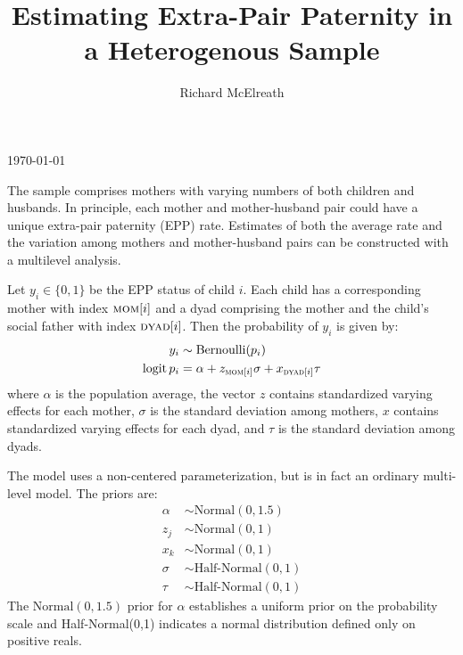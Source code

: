 \documentclass[reqno ,12pt]{amsart}
\DeclareMathOperator{\logit}{logit}
\newcommand{\mr}{\mathrm}
\begin{document}
\title{Estimating Extra-Pair Paternity in a Heterogenous Sample}
\author{Richard McElreath}
\address{Department of Human Behavior, Ecology and Culture, Max Planck Institute for Evolutionary Anthropology, Leipzig, Germany}


\maketitle

{\vspace{-6pt}\footnotesize\begin{center}\today\end{center}\vspace{12pt}}

\linenumbers
\modulolinenumbers[3]




The sample comprises mothers with varying numbers of both children and husbands. In principle, each mother and mother-husband pair could have a unique extra-pair paternity (EPP) rate. Estimates of both the average rate and the variation among mothers and mother-husband pairs can be constructed with a multilevel analysis.

Let $y_i \in \{0,1\}$ be the EPP status of child $i$. Each child has a corresponding mother with index $\textsc{mom}[i]$ and a dyad comprising the mother and the child's social father with index $\textsc{dyad}[i]$. Then the probability of $y_i$ is given by:
\begin{align*}
	y_i &\sim \mathrm{Bernoulli}(p_i)\\
	\logit p_i &= \alpha + z_{\textsc{mom}[i]} \sigma + x_{\textsc{dyad}[i]} \tau
\end{align*}
where $\alpha$ is the population average, the vector $z$ contains standardized varying effects for each mother, $\sigma$ is the standard deviation among mothers, $x$ contains standardized varying effects for each dyad, and $\tau$ is the standard deviation among dyads.

The model uses a non-centered parameterization, but is in fact an ordinary multi-level model. The priors are:
\begin{align*}
	\alpha &\sim \mr{Normal}(0,1.5)\\
	z_j &\sim \mr{Normal}(0,1)\\
	x_k &\sim \mr{Normal}(0,1)\\
	\sigma &\sim \text{Half-Normal}(0,1)\\
	\tau &\sim \text{Half-Normal}(0,1)
\end{align*}
The $\mr{Normal}(0,1.5)$ prior for $\alpha$ establishes a uniform prior on the probability scale and Half-Normal(0,1) indicates a normal distribution defined only on positive reals.
\end{document}
